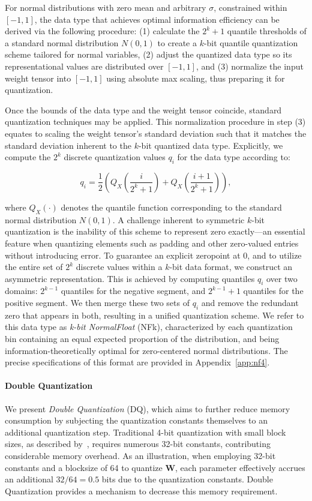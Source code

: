 For normal distributions with zero mean and arbitrary $\sigma$, constrained within $[-1, 1]$, the data type that achieves optimal information efficiency can be derived via the following procedure: (1) calculate the $2^k + 1$ quantile thresholds of a standard normal distribution $N(0, 1)$ to create a $k$-bit quantile quantization scheme tailored for normal variables, (2) adjust the quantized data type so its representational values are distributed over $[-1, 1]$, and (3) normalize the input weight tensor into $[-1, 1]$ using absolute max scaling, thus preparing it for quantization.

Once the bounds of the data type and the weight tensor coincide, standard quantization techniques may be applied. This normalization procedure in step (3) equates to scaling the weight tensor's standard deviation such that it matches the standard deviation inherent to the $k$-bit quantized data type. Explicitly, we compute the $2^k$ discrete quantization values $q_i$ for the data type according to:

\begin{equation}
q_i  = \frac{1}{2}\left( Q_X\left(\frac{i}{2^k+1}\right) + Q_X\left(\frac{i+1}{2^k+1}\right)\right),
\end{equation}

where $Q_X(\cdot)$ denotes the quantile function corresponding to the standard normal distribution $N(0,1)$. A challenge inherent to symmetric $k$-bit quantization is the inability of this scheme to represent zero exactly—an essential feature when quantizing elements such as padding and other zero-valued entries without introducing error. To guarantee an explicit zeropoint at $0$, and to utilize the entire set of $2^k$ discrete values within a $k$-bit data format, we construct an asymmetric representation. This is achieved by computing quantiles $q_i$ over two domains: $2^{k-1}$ quantiles for the negative segment, and $2^{k-1}+1$ quantiles for the positive segment. We then merge these two sets of $q_i$ and remove the redundant zero that appears in both, resulting in a unified quantization scheme. We refer to this data type as \emph{k-bit NormalFloat} (NFk), characterized by each quantization bin containing an equal expected proportion of the distribution, and being information-theoretically optimal for zero-centered normal distributions. The precise specifications of this format are provided in Appendix~\ref{app:nf4}.

\paragraph{Double Quantization}
We present \emph{Double Quantization} (DQ), which aims to further reduce memory consumption by subjecting the quantization constants themselves to an additional quantization step. Traditional 4-bit quantization with small block sizes, as described by~\citet{dettmers2022case}, requires numerous 32-bit constants, contributing considerable memory overhead. As an illustration, when employing 32-bit constants and a blocksize of 64 to quantize $\mathbf{W}$, each parameter effectively accrues an additional $32/64 = 0.5$ bits due to the quantization constants. Double Quantization provides a mechanism to decrease this memory requirement.

